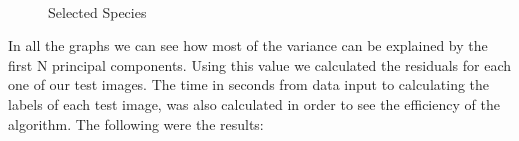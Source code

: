 \documentclass[11pt]{article}
\begin{document}
\begin{singlespace}
\begin{figure}[h]
    \\
    
    \caption{Selected Species}
\end{figure}

In all the graphs we can see how most of the variance can be explained by the first N principal components. Using this value we calculated the residuals for each one of our test images. The time in seconds from data input to calculating the labels of each test image, was also calculated in order to see the efficiency of the algorithm. The following were the results:


\end{singlespace}
\end{document}
